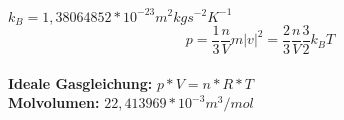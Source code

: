 
$k_B = 1,38064852 * 10^{-23} m^2kgs^{-2}K^{-1}$
\[p=\frac{1}{3} \frac{n}{V} m|v|^2=\frac{2}{3} \frac{n}{V} \frac{3}{2} k_BT\]\\

\textbf{Ideale Gasgleichung:} $p*V=n*R*T$\\

\textbf{Molvolumen:} $22,413969 * 10^{-3} m^3/mol$